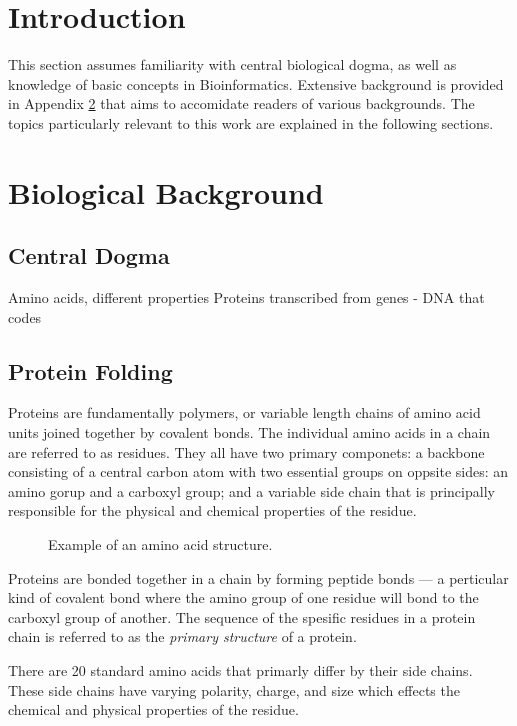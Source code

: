 \section{Introduction}
This section assumes familiarity with central biological dogma, as well as knowledge of basic concepts in Bioinformatics. Extensive background is provided in Appendix \ref{appendix:bio-background} that aims to accomidate readers of various backgrounds. The topics particularly relevant to this work are explained in the following sections. 

\section{Biological Background}
\label{appendix:bio-background}
\subsection{Central Dogma}
Amino acids, different properties
Proteins transcribed from genes - DNA that codes 

\subsection{Protein Folding}
Proteins are fundamentally polymers, or variable length chains of amino acid units joined together by covalent bonds.
The individual amino acids in a chain are referred to as residues. 
They all have two primary componets: a backbone consisting of a central carbon atom with two essential groups on oppsite sides: an  amino gorup and a   carboxyl group; and a variable side chain that is principally responsible for the physical and chemical properties of the residue.
\begin{figure}[ht] %
    \centering
    \caption{Example of an amino acid structure.}
    \label{fig:AA-prop}
\end{figure}
Proteins are bonded together in a chain by forming peptide bonds --- a perticular kind of covalent bond where the amino group of one residue will bond to the carboxyl group of another. The sequence of the spesific residues in a protein chain is referred to as the \emph{primary structure} of a protein. 

There are 20 standard amino acids that primarly differ by their side chains. These side chains have varying polarity, charge, and size which effects the chemical and physical properties of the residue.

